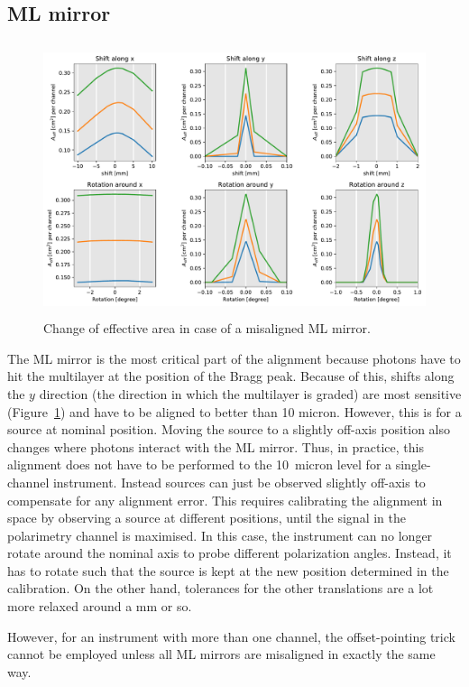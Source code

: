 \documentclass[]{spie}  %
\begin{document}
\subsection{ML mirror}
\begin{figure} [ht]
  \begin{center}
    \includegraphics[height=8cm]{LGML_global.pdf}
  \end{center}
  \caption
      { \label{fig:LGML_global}Change of effective area in case of a misaligned ML mirror. 
}
\end{figure}

The ML mirror is the most critical part of the alignment because photons have
to hit the multilayer at the position of the Bragg peak. Because of
this, shifts along the $y$ direction (the direction in which the
multilayer is graded) are most sensitive
(Figure~\ref{fig:LGML_global}) and have to be aligned to better than
10 micron. However, this is for a source at nominal position. Moving
the source to a slightly off-axis position also changes where photons
interact with the ML mirror. Thus, in practice, this alignment does
not have to be performed to the 10~micron level for a single-channel
instrument. Instead sources can just be observed slightly off-axis to
compensate for any alignment error. This requires calibrating the
alignment in space by observing a source at different positions, until
the signal in the polarimetry channel is maximised. In this case, the
instrument can no longer rotate around the nominal axis to probe
different polarization angles. Instead, it has to rotate such that the
source is kept at the new position determined in the calibration. On
the other hand, tolerances for the other translations are a lot more
relaxed around a mm or so.

However, for an instrument with more than one channel, the
offset-pointing trick cannot be employed unless all ML mirrors are
misaligned in exactly the same way.
\end{document}
